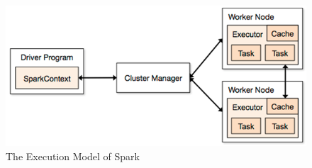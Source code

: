 \begin{figure}[h]
\centering
\includegraphics[scale=0.8]{figures/SparkExec.png}
\caption{The Execution Model of Spark \cite{ApacheSpark}}
\label{SparkExec}
\end{figure}








